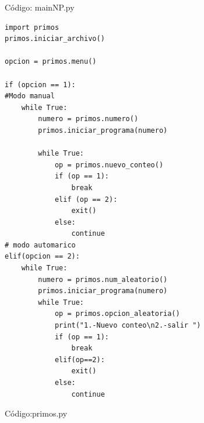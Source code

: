 \documentclass[12pt,letterpaper]{article}
\begin{document}
C\'odigo: mainNP.py
\lstset{language=Python, breaklines=true, basicstyle=\footnotesize}
\begin{lstlisting}[frame=single]
import primos
primos.iniciar_archivo()

opcion = primos.menu()

if (opcion == 1):
#Modo manual
	while True:
		numero = primos.numero()
		primos.iniciar_programa(numero)
		
		while True:
			op = primos.nuevo_conteo()
			if (op == 1):
				break
			elif (op == 2):
				exit()
			else:
				continue
# modo automarico
elif(opcion == 2):
	while True:
		numero = primos.num_aleatorio()
		primos.iniciar_programa(numero)
		while True:
			op = primos.opcion_aleatoria()
			print("1.-Nuevo conteo\n2.-salir ")
			if (op == 1):
				break
			elif(op==2):
				exit()
			else:
				continue

\end{lstlisting}
\vspace{1.5cm}
C\'odigo:primos.py
\lstset{language=Python, breaklines=true, basicstyle=\footnotesize}
\end{document}
